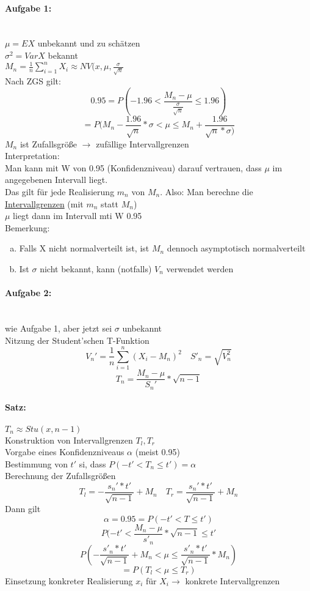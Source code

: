 \documentclass[a4paper,12pt]{scrartcl}
\begin{document}
  \paragraph{Aufgabe 1:}\quad\\
		$\mu = EX$ unbekannt und zu schätzen\\
		$\sigma^2 = VarX$ bekannt\\
  
  $M_n = \frac{1}{n}\sum_{i=1}^nX_i\approx NV(x,\mu,\frac{\sigma}{\sqrt{n}}$\\
  Nach ZGS gilt:
  $$0.95 = P(-1.96<\frac{M_n-\mu}{\frac{\sigma}{\sqrt{n}}}\leq 1.96)$$
  $$=P(M_n-\frac{1.96}{\sqrt{n}}*\sigma<\mu\leq M_n+\frac{1.96}{\sqrt{n}*\sigma)} $$
  $M_n$ ist Zufallsgröße $\to$ zufällige Intervallgrenzen\\
  Interpretation:\\
    Man kann mit W von 0.95 (Konfidenzniveau) darauf vertrauen, dass $\mu$ im angegebenen Intervall liegt.\\
    Das gilt für jede Realisierung $m_n$ von $M_n$.
  Also:
    Man berechne die \underline{Intervallgrenzen} (mit $m_n$ statt $M_n$)\\
    $\mu$ liegt dann im Intervall mti W 0.95\\
  Bemerkung:
  \begin{enumerate}[(a)]
   \item Falls X nicht normalverteilt ist, ist $M_n$ dennoch asymptotisch normalverteilt
   \item Ist $\sigma$ nicht bekannt, kann (notfalls) $V_n$ verwendet werden
  \end{enumerate}

  \paragraph{Aufgabe 2:}\quad\\
  wie Aufgabe 1, aber jetzt sei $\sigma$ unbekannt\\
  Nitzung der Student'schen T-Funktion
  $$V_n' = \frac{1}{n}\sum_{i=1}^n(X_i-M_n)^2\quad S'_n=\sqrt{V_n^2}$$
  $$T_n = \frac{M_n-\mu}{S_n'}*\sqrt{n-1}$$
  \paragraph{Satz:} $T_n\approx Stu(x,n-1)$\\
  Konstruktion von Intervallgrenzen $T_l,T_r$\\
  Vorgabe eines Konfidenzniveaus $\alpha$ (meist 0.95)\\
  Bestimmung von $t'$ si, dass $P(-t'<T_n\leq t') = \alpha$\\
  Berechnung der Zufallsgrößen
  $$T_l = -\frac{s_n'*t'}{\sqrt{n-1}}+M_n\quad T_r=\frac{s_n'*t'}{\sqrt{n-1}}+M_n $$
  Dann gilt
  $$\alpha = 0.95 = P(-t'<T\leq t') $$
  $$P(-t'< \frac{M_n-\mu}{s'_n}*\sqrt{n-1} \leq t' $$
  $$P(-\frac{s'_n*t'}{\sqrt{n-1}}+M_n<\mu \leq \frac{s'_n*t'}{\sqrt{n-1}}*M_n)$$
  $$=P(T_l<\mu\leq T_r) $$
  Einsetzung konkreter Realisierung $x_i$ für $X_i \to$ konkrete Intervallgrenzen
  
\end{document}
